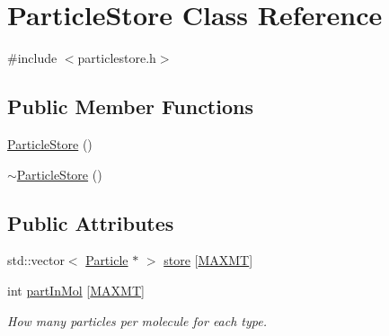 \hypertarget{class_particle_store}{\section{Particle\+Store Class Reference}
\label{class_particle_store}
}


{\ttfamily \#include $<$particlestore.\+h$>$}

\subsection*{Public Member Functions}
\begin{DoxyCompactItemize}
\item 
\hyperlink{class_particle_store_af949fe5f1028e9d622a1c82dd750ec76}{Particle\+Store} ()
\item 
\hyperlink{class_particle_store_ac8deced78d863d49bc0119bbb55d1478}{$\sim$\+Particle\+Store} ()
\end{DoxyCompactItemize}
\subsection*{Public Attributes}
\begin{DoxyCompactItemize}
\item 
std\+::vector$<$ \hyperlink{class_particle}{Particle} $\ast$ $>$ \hyperlink{class_particle_store_a400507af548e0f0adcb216d96e515daa}{store} \mbox{[}\hyperlink{macros_8h_ad002a98462c90c52983b122ab9e2059a}{M\+A\+X\+M\+T}\mbox{]}
\item 
int \hyperlink{class_particle_store_a75d2df6a6f2976fdd3087aae11a199eb}{part\+In\+Mol} \mbox{[}\hyperlink{macros_8h_ad002a98462c90c52983b122ab9e2059a}{M\+A\+X\+M\+T}\mbox{]}
\begin{DoxyCompactList}\small\item\em How many particles per molecule for each type. \end{DoxyCompactList}\end{DoxyCompactItemize}


